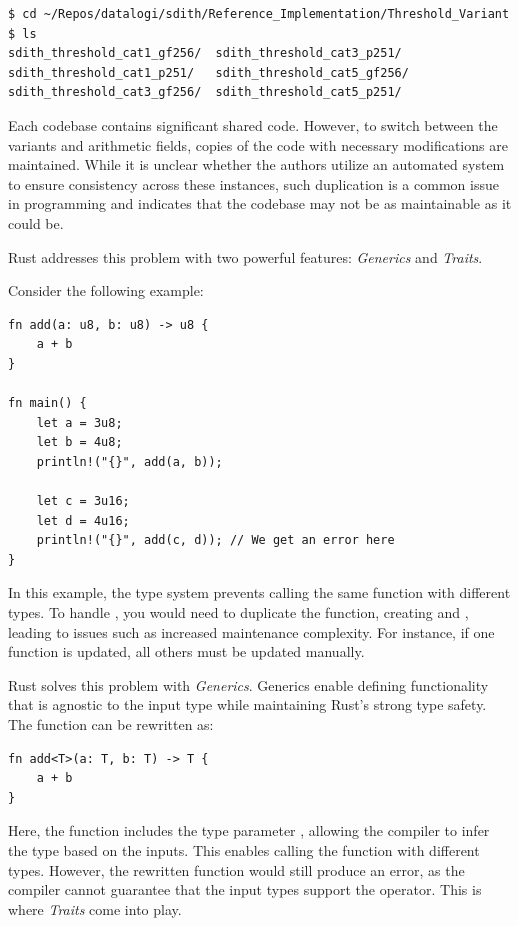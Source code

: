 \documentclass[11pt]{report}
\theoremstyle{definition}
\theoremstyle{plain}
\begin{document}
\begin{verbatim}
$ cd ~/Repos/datalogi/sdith/Reference_Implementation/Threshold_Variant 
$ ls
sdith_threshold_cat1_gf256/  sdith_threshold_cat3_p251/
sdith_threshold_cat1_p251/   sdith_threshold_cat5_gf256/
sdith_threshold_cat3_gf256/  sdith_threshold_cat5_p251/
\end{verbatim}

Each codebase contains significant shared code. However, to switch between the variants and arithmetic fields, copies of the code with necessary modifications are maintained. While it is unclear whether the authors utilize an automated system to ensure consistency across these instances, such duplication is a common issue in programming and indicates that the codebase may not be as maintainable as it could be.

Rust addresses this problem with two powerful features: \textit{Generics} and \textit{Traits}.

Consider the following example:

\begin{verbatim}
fn add(a: u8, b: u8) -> u8 {
    a + b
}

fn main() {
    let a = 3u8;
    let b = 4u8;
    println!("{}", add(a, b));

    let c = 3u16;
    let d = 4u16;
    println!("{}", add(c, d)); // We get an error here
}
\end{verbatim}

In this example, the type system prevents calling the same function with different types. To handle , you would need to duplicate the function, creating  and , leading to issues such as increased maintenance complexity. For instance, if one function is updated, all others must be updated manually.

Rust solves this problem with \textit{Generics}. Generics enable defining functionality that is agnostic to the input type while maintaining Rust's strong type safety. The function  can be rewritten as:

\begin{verbatim}
fn add<T>(a: T, b: T) -> T {
    a + b
}
\end{verbatim}

Here, the function  includes the type parameter , allowing the compiler to infer the type based on the inputs. This enables calling the function with different types. However, the rewritten function would still produce an error, as the compiler cannot guarantee that the input types support the \rust{+} operator. This is where \textit{Traits} come into play.
\end{document}
